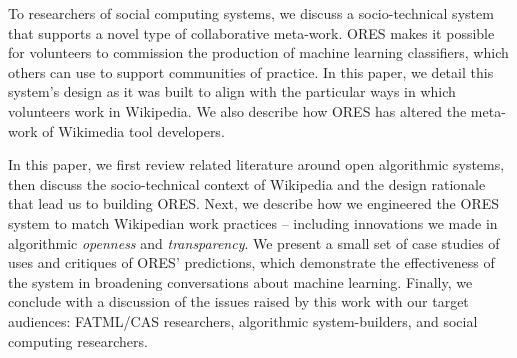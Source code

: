 To researchers of social computing systems, we discuss a socio-technical system that supports a novel type of collaborative meta-work. ORES makes it possible for volunteers to commission the production of machine learning classifiers, which others can use to support communities of practice. In this paper, we detail this system's design as it was built to align with the particular ways in which volunteers work in Wikipedia. We also describe how ORES has altered the meta-work of Wikimedia tool developers.

In this paper, we first review related literature around open algorithmic systems, then discuss the socio-technical context of Wikipedia and the design rationale that lead us to building ORES.  Next, we describe how we engineered the ORES system to match Wikipedian work practices -- including innovations we made in algorithmic \emph{openness} and \emph{transparency}. We present a small set of case studies of uses and critiques of ORES' predictions, which demonstrate the effectiveness of the system in broadening conversations about machine learning.  Finally, we conclude with a discussion of the issues raised by this work with our target audiences: FATML/CAS researchers, algorithmic system-builders, and social computing researchers.
